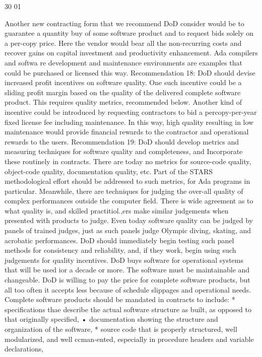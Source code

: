\documentclass[12pt]{article}
\begin{document}
30
01

Another new contracting form that we recommend DoD consider would be to guarantee
a quantity buy of some software product and to request bids solely on a per-copy price. Here
the vendor would bear all the non-recurring costs and recover gains on capital investment
and productivity enhancement. Ada compilers and softwa re development and maintenance
environments are examples that could be purchased or licensed this way.
Recommendation 18: DoD should devise increased profit incentives on
software quality.
One such incentive could be a sliding profit margin based on the quality of the delivered
complete software product. This requires quality metrics, recommended below.
Another kind of incentive could be introduced by requesting contractors to bid a percopy-per-year fixed license fee including maintenance. In this way, high quality resulting in
low maintenance would provide financial rewards to the contractor and operational rewards
to the users.
Recommendation 19: DoD should develop metrics and measuring techniques for software quality and completeness, and Incorporate these routinely
in contracts.
There are today no metrics for source-code quality, object-code quality, documentation
quality, etc. Part of the STARS methodological effort should be addressed to such metrics,
for Ada programs in particular.
Meanwhile, there are techniques for judging the over-all quality of complex performances outside the computer field. There is wide agreement as to what quality is, and
skilled practitiol.,ers make similar judgements when presented with products to judge. Even
today software quality can be judged by panels of trained judges, just as such panels judge
Olympic diving, skating, and acrobatic performances. DoD should immediately begin
testing such panel methods for consistency and reliability, and, if they work, begin using
such judgements for quality incentives.
DoD buys software for operational systems that will be used ior a decade or more.
The software must be maintainable and changeable. DoD is willing to pay the price for
complete software products, but all too often it accepts less because of schedule slippages
and operational needs.
Complete software products should be mandated in contracts to include:
* specifications thae describe the actual software structure as built, as opposed to
that originally specified,
• documentation showing the structure and organization of the software,
* source code that is properly structured, well modularized, and well ccman-ented,
especially in procedure headers and variable declarations,
\end{document}
